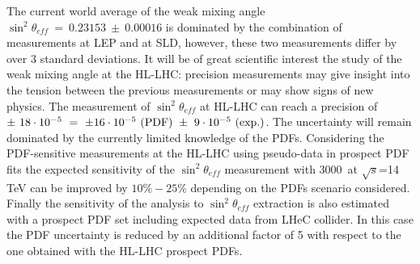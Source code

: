 \documentclass{article}
\begin{document}
\vspace{5mm}
\noindent
The current world average of the weak mixing angle $\sin^2\theta_{eff}~=~0.23153~\pm~0.00016$ is dominated by the combination of measurements at LEP and at SLD, however, these two measurements differ by over 3 standard deviations. It will be of great scientific interest the study of the weak mixing angle at the HL-LHC: precision measurements may give insight into the tension between the previous measurements or may show signs of new physics. The measurement of $\sin^2\theta_{eff}$ at HL-LHC can reach a precision of $\pm~ 18 \cdot 10^{-5} ~= ~\pm 16 \cdot 10^{-5} ~({\rm PDF}) ~\pm~ 9 \cdot 10^{-5} ~({\rm exp.})$. The uncertainty will remain dominated by the currently limited knowledge of the PDFs. Considering the PDF-sensitive measurements at the HL-LHC using pseudo-data in prospect PDF fits the expected sensitivity of the
$\sin^2\theta_{eff}$ measurement with 3000~\ifb at
$\sqrt{s}$=14 TeV can be improved by $10\% - 25\%$ depending on the PDFs scenario considered.
Finally the sensitivity of the analysis to $\sin^2\theta_{eff}$ extraction is also estimated with a prospect PDF set including expected data from LHeC collider. In this case the PDF uncertainty is reduced by an additional factor of 5 with respect to the one obtained with the HL-LHC prospect PDFs.
\end{document}
